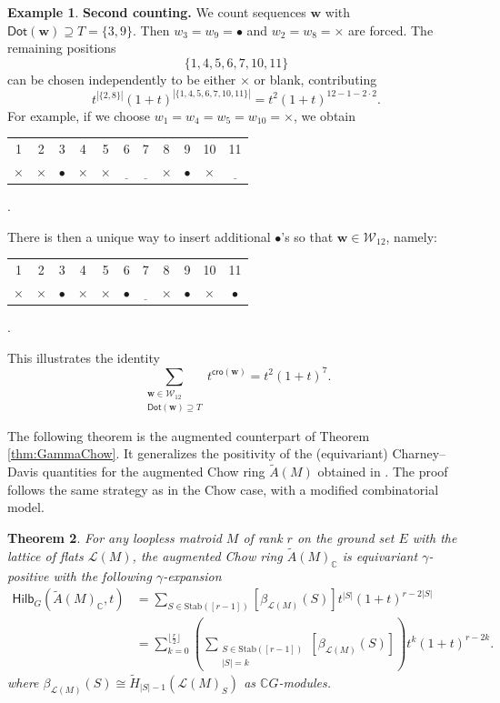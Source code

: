 \documentclass[reqno]{amsart}
\newcommand{\Stab}{{\mathrm{Stab}}}
\newcommand{\cro}{{\mathsf{cro}}}
\renewcommand{\Dot}{{\mathsf{Dot}}}
\renewcommand{\L}{{\mathcal{L}}}
\newcommand{\Hilb}{{\mathsf{Hilb}}}
\newcommand{\floor}[1]{\lfloor #1 \rfloor}
\newtheorem{thm}{Theorem}[section]
\theoremstyle{definition}
\newtheorem{exa}[thm]{Example}
\theoremstyle{remark}
\begin{document}
\begin{exa}
\medskip
\noindent
\textbf{Second counting.}
We count sequences $\mathbf{w}$ with $\Dot(\mathbf{w})\supseteq T=\{3,9\}$. Then $w_3=w_9=\bullet$ and $w_2=w_8=\times$ are forced. The remaining positions
\[
\{1,4,5,6,7,10,11\}
\]
can be chosen independently to be either $\times$ or blank, contributing
\[
t^{|\{2,8\}|}(1+t)^{|\{1,4,5,6,7,10,11\}|}
= t^2(1+t)^{12-1-2\cdot 2}.
\]
For example, if we choose $w_1=w_4=w_5=w_{10}=\times$, we obtain
\begin{center}
\begin{tabular}{c c c c c c c c c c c}
1 & 2 & 3 & 4 & 5 & 6 & 7 & 8 & 9 & 10 & 11\\
$\times$ & $\times$ & $\bullet$ & $\times$ & $\times$ & $\underline{\phantom{~}}$ & $\underline{\phantom{~}}$ & $\times$ & $\bullet$ & $\times$ & $\underline{\phantom{~}}$
\end{tabular}.
\end{center}
There is then a unique way to insert additional $\bullet$'s so that $\mathbf{w}\in\mathcal{W}_{12}$, namely:
\begin{center}
\begin{tabular}{c c c c c c c c c c c}
1 & 2 & 3 & 4 & 5 & 6 & 7 & 8 & 9 & 10 & 11\\
$\times$ & $\times$ & $\bullet$ & $\times$ & $\times$ & $\bullet$ & $\underline{\phantom{~}}$ & $\times$ & $\bullet$ & $\times$ & $\bullet$
\end{tabular}.
\end{center}
This illustrates the identity
\[
\sum_{\substack{\mathbf{w}\in\mathcal{W}_{12}\\ \Dot(\mathbf{w})\supseteq T}}
t^{\cro(\mathbf{w})}
= t^2(1+t)^7.
\]
\end{exa}
 
The following theorem is the augmented counterpart of Theorem \ref{thm:GammaChow}. 
It generalizes the positivity of the (equivariant) Charney--Davis quantities for the augmented Chow ring $\widetilde{A}(M)$ obtained in \cite[Lemma~4.12]{Liao2023Two}.
The proof follows the same strategy as in the Chow case, with a modified combinatorial model.

\begin{thm} \label{thm:GammaAug}
For any loopless matroid $M$ of rank $r$ on the ground set $E$ with the lattice of flats $\L(M)$, the augmented Chow ring $\widetilde{A}(M)_{\mathbb{C}}$ is equivariant $\gamma$-positive with the following $\gamma$-expansion
\begin{align*}
    \Hilb_{G}(\widetilde{A}(M)_{\mathbb{C}},t) 
    &=\sum_{S\in\Stab([r-1])}[\beta_{\L(M)}(S)] t^{|S|}(1+t)^{r-2|S|}\\
    &=\sum_{k=0}^{\floor{\frac{r}{2}}}\left(\sum_{\substack{S\in\Stab([r-1])\\ |S|=k}}[\beta_{\L(M)}(S)]\right)t^k(1+t)^{r-2k}.
\end{align*}
where $\beta_{\L(M)}(S)\cong \tilde{H}_{|S|-1}(\L(M)_S)$ as $\mathbb{C}G$-modules.
\end{thm}
\end{document}
